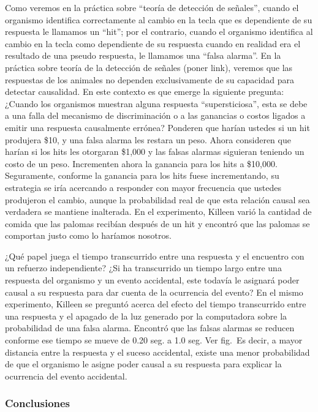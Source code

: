 \documentclass[
  letterpaper,
]{book}
\begin{document}
Como veremos en la práctica sobre ``teoría de detección de señales'',
cuando el organismo identifica correctamente al cambio en la tecla que
es dependiente de su respuesta le llamamos un ``hit''; por el contrario,
cuando el organismo identifica al cambio en la tecla como dependiente de
su respuesta cuando en realidad era el resultado de una pseudo
respuesta, le llamamos una ``falsa alarma''. En la práctica sobre teoría
de la detección de señales (poner link), veremos que las respuestas de
los animales no dependen exclusivamente de su capacidad para detectar
causalidad. En este contexto es que emerge la siguiente pregunta:
¿Cuando los organismos muestran alguna respuesta ``supersticiosa'', esta
se debe a una falla del mecanismo de discriminación o a las ganancias o
costos ligados a emitir una respuesta causalmente errónea? Ponderen que
harían ustedes si un hit produjera \$10, y una falsa alarma les restara
un peso. Ahora consideren que harían si los hits les otorgaran \$1,000 y
las falsas alarmas siguieran teniendo un costo de un peso. Incrementen
ahora la ganancia para los hits a \$10,000. Seguramente, conforme la
ganancia para los hits fuese incrementando, su estrategia se iría
acercando a responder con mayor frecuencia que ustedes produjeron el
cambio, aunque la probabilidad real de que esta relación causal sea
verdadera se mantiene inalterada. En el experimento, Killeen varió la
cantidad de comida que las palomas recibían después de un hit y encontró
que las palomas se comportan justo como lo haríamos nosotros.

¿Qué papel juega el tiempo transcurrido entre una respuesta y el
encuentro con un refuerzo independiente? ¿Si ha transcurrido un tiempo
largo entre una respuesta del organismo y un evento accidental, este
todavía le asignará poder causal a su respuesta para dar cuenta de la
ocurrencia del evento? En el mismo experimento, Killeen se preguntó
acerca del efecto del tiempo transcurrido entre una respuesta y el
apagado de la luz generado por la computadora sobre la probabilidad de
una falsa alarma. Encontró que las falsas alarmas se reducen conforme
ese tiempo se mueve de 0.20 seg. a 1.0 seg. Ver fig.~Es decir, a mayor
distancia entre la respuesta y el suceso accidental, existe una menor
probabilidad de que el organismo le asigne poder causal a su respuesta
para explicar la ocurrencia del evento accidental.

\subsubsection{Conclusiones}\label{conclusiones}
\end{document}
